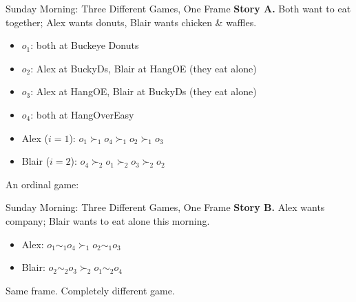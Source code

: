 \begin{frame}{Sunday Morning: Three Different Games, One Frame}
\textbf{Story A.} Both want to eat together; Alex wants donuts, Blair wants
chicken \& waffles.
\begin{itemize}
    \item $o_1$: both at Buckeye Donuts
    \item $o_2$: Alex at BuckyDs, Blair at HangOE (they eat alone)
    \item $o_3$: Alex at HangOE, Blair at BuckyDs (they eat alone)
    \item $o_4$: both at HangOverEasy
\end{itemize}
\begin{itemize}
    \item Alex ($i=1$): $o_1\succ_1 o_4\succ_1 o_2\succ_1 o_3$
    \item Blair ($i=2$): $o_4\succ_2 o_1\succ_2 o_3\succ_2 o_2$
\end{itemize}
\bsk
An ordinal game:\\
\centering
\begin{matrixgame}[top={BuckyDs, HangOE}, left={BuckyDs, HangOE}, player names={Alex, Blair}]
\end{matrixgame}
\vfill
\end{frame}

\begin{frame}{Sunday Morning: Three Different Games, One Frame}
\textbf{Story B.} Alex wants company; Blair wants to eat alone this morning.
\bsk
\begin{itemize}
    \item Alex: $o_1\sim_1 o_4\succ_1 o_2\sim_1 o_3$
    \item Blair: $o_2\sim_2 o_3\succ_2 o_1\sim_2 o_4$
\end{itemize}
\bsk
\centering
\begin{matrixgame}[top={BuckyDs, HangOE}, left={BuckyDs, HangOE}, player names={Alex, Blair}]
\end{matrixgame}
\vfill
\raggedright
Same frame. Completely different game. \vspace{0.4in}
\end{frame}

